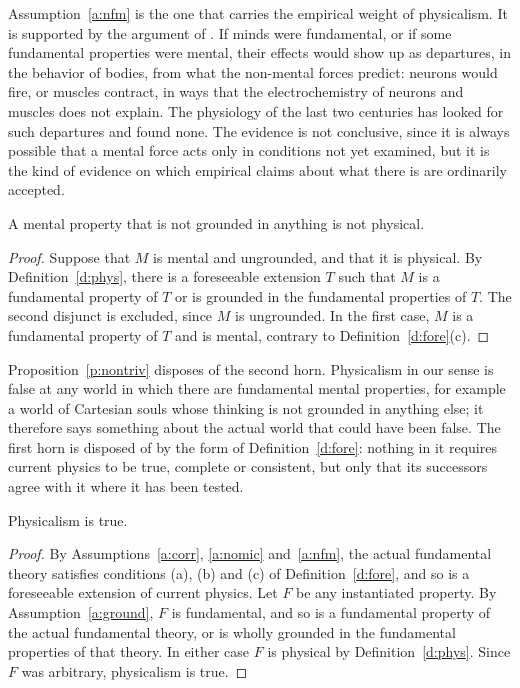 \documentclass{situationist-preprint}
\begin{document}
Assumption~\ref{a:nfm} is the one that carries the empirical weight of physicalism. It is supported by the argument of \citet{Papineau2001}. If minds were fundamental, or if some fundamental properties were mental, their effects would show up as departures, in the behavior of bodies, from what the non-mental forces predict: neurons would fire, or muscles contract, in ways that the electrochemistry of neurons and muscles does not explain. The physiology of the last two centuries has looked for such departures and found none. The evidence is not conclusive, since it is always possible that a mental force acts only in conditions not yet examined, but it is the kind of evidence on which empirical claims about what there is are ordinarily accepted.

\begin{proposition}\label{p:nontriv}
A mental property that is not grounded in anything is not physical.
\end{proposition}

\begin{proof}
Suppose that $M$ is mental and ungrounded, and that it is physical. By Definition~\ref{d:phys}, there is a foreseeable extension $T$ such that $M$ is a fundamental property of $T$ or is grounded in the fundamental properties of $T$. The second disjunct is excluded, since $M$ is ungrounded. In the first case, $M$ is a fundamental property of $T$ and is mental, contrary to Definition~\ref{d:fore}(c).
\end{proof}

Proposition~\ref{p:nontriv} disposes of the second horn. Physicalism in our sense is false at any world in which there are fundamental mental properties, for example a world of Cartesian souls whose thinking is not grounded in anything else; it therefore says something about the actual world that could have been false. The first horn is disposed of by the form of Definition~\ref{d:fore}: nothing in it requires current physics to be true, complete or consistent, but only that its successors agree with it where it has been tested.

\begin{theorem}\label{t:main}
Physicalism is true.
\end{theorem}

\begin{proof}
By Assumptions~\ref{a:corr}, \ref{a:nomic} and~\ref{a:nfm}, the actual fundamental theory satisfies conditions (a), (b) and (c) of Definition~\ref{d:fore}, and so is a foreseeable extension of current physics. Let $F$ be any instantiated property. By Assumption~\ref{a:ground}, $F$ is fundamental, and so is a fundamental property of the actual fundamental theory, or is wholly grounded in the fundamental properties of that theory. In either case $F$ is physical by Definition~\ref{d:phys}. Since $F$ was arbitrary, physicalism is true.
\end{proof}
\end{document}
